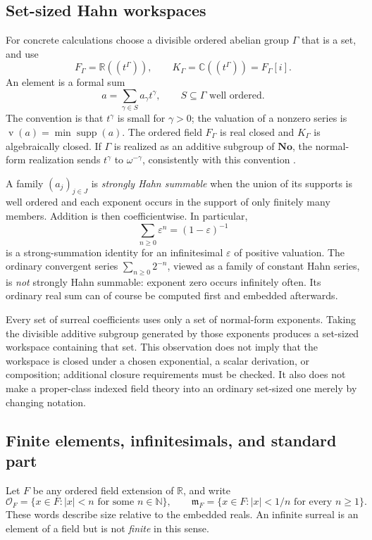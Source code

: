 \documentclass[11pt,a4paper]{article}
\numberwithin{equation}{section}
\theoremstyle{definition}
\theoremstyle{remark}
\newcommand{\R}{\mathbb R}
\newcommand{\C}{\mathbb C}
\newcommand{\N}{\mathbb N}
\newcommand{\No}{\mathbf{No}}
\newcommand{\OO}{\mathcal O}
\newcommand{\mm}{\mathfrak m}
\newcommand{\supp}{\operatorname{supp}}
\newcommand{\val}{\operatorname{v}}
\begin{document}
\subsection{Set-sized Hahn workspaces}
For concrete calculations choose a divisible ordered abelian group $\Gamma$ that
is a set, and use
\begin{equation}\label{eq:hahn}
F_\Gamma=\R((t^\Gamma)),\qquad
K_\Gamma=\C((t^\Gamma))=F_\Gamma[i].
\end{equation}
An element is a formal sum
\[
a=\sum_{\gamma\in S}a_\gamma t^\gamma,
\qquad S\subseteq\Gamma\text{ well ordered}.
\]
The convention is that $t^\gamma$ is small for $\gamma>0$; the valuation of a
nonzero series is $\val(a)=\min\supp(a)$. The ordered field $F_\Gamma$ is
real closed and $K_\Gamma$ is algebraically closed. If $\Gamma$ is realized as
an additive subgroup of $\No$, the normal-form realization sends
$t^\gamma$ to $\omega^{-\gamma}$, consistently with this convention
\cite{BM,EK}.

A family $(a_j)_{j\in J}$ is \emph{strongly Hahn summable} when the union of its
supports is well ordered and each exponent occurs in the support of only
finitely many members. Addition is then coefficientwise. In particular,
\begin{equation}\label{eq:geom}
\sum_{n\ge0}\varepsilon^n=(1-\varepsilon)^{-1}
\end{equation}
is a strong-summation identity for an infinitesimal $\varepsilon$ of positive
valuation. The ordinary convergent series $\sum_{n\ge0}2^{-n}$, viewed as a
family of constant Hahn series, is \emph{not} strongly Hahn summable: exponent
zero occurs infinitely often. Its ordinary real sum can of course be computed
first and embedded afterwards.

Every set of surreal coefficients uses only a set of normal-form exponents.
Taking the divisible additive subgroup generated by those exponents produces a
set-sized workspace containing that set. This observation does not imply that
the workspace is closed under a chosen exponential, a scalar derivation, or
composition; additional closure requirements must be checked. It also does not
make a proper-class indexed field theory into an ordinary set-sized one merely
by changing notation.

\subsection{Finite elements, infinitesimals, and standard part}
Let $F$ be any ordered field extension of $\R$, and write
\[
\OO_F=\{x\in F: |x|<n\text{ for some }n\in\N\},\qquad
\mm_F=\{x\in F: |x|<1/n\text{ for every }n\ge1\}.
\]
These words describe size relative to the embedded reals. An infinite surreal
is an element of a field but is not \emph{finite} in this sense.
\end{document}
